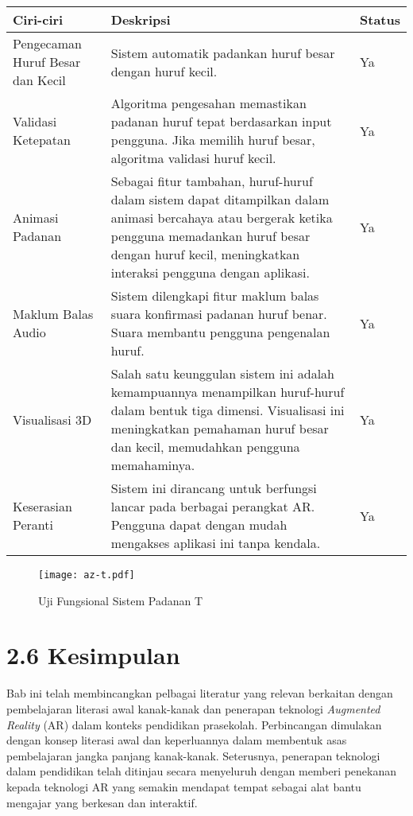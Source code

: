 \begin{itemize}
\begin{itemize}
\begin{itemize}
\begin{itemize}
\begin{itemize}
\begin{itemize}
\begin{itemize}
\begin{itemize}
\begin{flushleft}
\begin{tabular}{>{\raggedright}p{3cm}p{9cm}>{\centering\arraybackslash}p{2cm}}
\toprule
\textbf{Ciri-ciri} & \textbf{Deskripsi} & \textbf{Status} \\
\midrule
Pengecaman Huruf Besar dan Kecil & Sistem automatik padankan huruf besar dengan huruf kecil. & Ya \\

Validasi Ketepatan & Algoritma pengesahan memastikan padanan huruf tepat berdasarkan input pengguna. Jika memilih huruf besar, algoritma validasi huruf kecil. & Ya \\

Animasi Padanan & Sebagai fitur tambahan, huruf-huruf dalam sistem dapat ditampilkan dalam animasi bercahaya atau bergerak ketika pengguna memadankan huruf besar dengan huruf kecil, meningkatkan interaksi pengguna dengan aplikasi. & Ya \\

Maklum Balas Audio & Sistem dilengkapi fitur maklum balas suara konfirmasi padanan huruf benar. Suara membantu pengguna pengenalan huruf. & Ya \\

Visualisasi 3D & Salah satu keunggulan sistem ini adalah kemampuannya menampilkan huruf-huruf dalam bentuk tiga dimensi. Visualisasi ini meningkatkan pemahaman huruf besar dan kecil, memudahkan pengguna memahaminya. & Ya \\

Keserasian Peranti & Sistem ini dirancang untuk berfungsi lancar pada berbagai perangkat AR. Pengguna dapat dengan mudah mengakses aplikasi ini tanpa kendala. & Ya \\
\bottomrule
\end{tabular}

\begin{figure}
    \centering
    \texttt{[image: az-t.pdf]}
    \caption{Uji Fungsional  Sistem Padanan T }
    \label{fig:az-s.pdf}
\end{figure}


\section*{2.6 Kesimpulan}

Bab ini telah membincangkan pelbagai literatur yang relevan berkaitan dengan pembelajaran literasi awal kanak-kanak dan penerapan teknologi \textit{Augmented Reality} (AR) dalam konteks pendidikan prasekolah. Perbincangan dimulakan dengan konsep literasi awal dan keperluannya dalam membentuk asas pembelajaran jangka panjang kanak-kanak. Seterusnya, penerapan teknologi dalam pendidikan telah ditinjau secara menyeluruh dengan memberi penekanan kepada teknologi AR yang semakin mendapat tempat sebagai alat bantu mengajar yang berkesan dan interaktif.


\end{flushleft}
\end{itemize}
\end{itemize}
\end{itemize}
\end{itemize}
\end{itemize}
\end{itemize}
\end{itemize}
\end{itemize}

